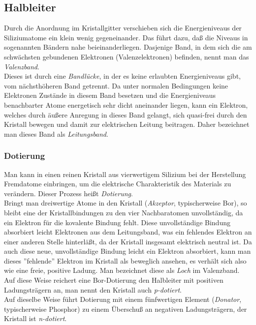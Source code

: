 \subsection{Halbleiter}

Durch die Anordnung im Kristallgitter verschieben sich die Energieniveaus der Siliziumatome ein klein wenig gegeneinander. Das führt dazu, daß die Niveaus in sogenannten Bändern nahe beieinanderliegen. Dasjenige Band, in dem sich die am schwächsten gebundenen Elektronen (Valenzelektronen) befinden, nennt man das \textit{Valenzband}. \\
Dieses ist durch eine \textit{Bandlücke}, in der es keine erlaubten Energieniveaus gibt, vom nächsthöheren Band getrennt. Da unter normalen Bedingungen keine Elektronen Zustände in diesem Band besetzen und die Energieniveaus benachbarter Atome energetisch sehr dicht aneinander liegen, kann ein Elektron, welches durch äußere Anregung in dieses Band gelangt, sich quasi-frei durch den Kristall bewegen und damit zur elektrischen Leitung beitragen. Daher bezeichnet man dieses Band als \textit{Leitungsband}.

\subsubsection{Dotierung}

Man kann in einen reinen Kristall aus vierwertigem Silizium bei der Herstellung Fremdatome einbringen, um die elektrische Charakteristik des Materials zu verändern. Dieser Prozess heißt \textit{Dotierung}.\\
Bringt man dreiwertige Atome in den Kristall (\textit{Akzeptor}, typischerweise Bor), so bleibt eine der Kristallbindungen zu den vier Nachbaratomen unvollständig, da ein Elektron für die kovalente Bindung fehlt. Diese unvollständige Bindung absorbiert leicht Elektronen aus dem Leitungsband, was ein fehlendes Elektron an einer anderen Stelle hinterläßt, da der Kristall insgesamt elektrisch neutral ist. Da auch diese neue, unvollständige Bindung leicht ein Elektron absorbiert, kann man dieses ''fehlende'' Elektron im Kristall als beweglich ansehen, es verhält sich also wie eine freie, positive Ladung. Man bezeichnet diese als \textit{Loch} im Valenzband. Auf diese Weise reichert eine Bor-Dotierung den Halbleiter mit positiven Ladungsträgern an, man nennt den Kristall auch \textit{p-dotiert}.\\
Auf dieselbe Weise führt Dotierung mit einem fünfwertigen Element (\textit{Donator}, typischerweise Phosphor) zu einem Überschuß an negativen Ladungsträgern, der Kristall ist \textit{n-dotiert}.

